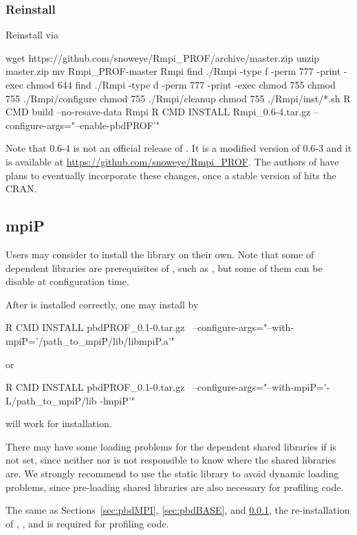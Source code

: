 \subsubsection{Reinstall }
\label{sec:Rmpi}

Reinstall  via
\begin{Command}
wget https://github.com/snoweye/Rmpi_PROF/archive/master.zip
unzip master.zip
mv Rmpi_PROF-master Rmpi
find ./Rmpi -type f -perm 777 -print -exec chmod 644 {} \;
find ./Rmpi -type d -perm 777 -print -exec chmod 755 {} \;
chmod 755 ./Rmpi/configure
chmod 755 ./Rmpi/cleanup
chmod 755 ./Rmpi/inst/*.sh
R CMD build --no-resave-data Rmpi
R CMD INSTALL Rmpi_0.6-4.tar.gz --configure-args="--enable-pbdPROF'"
\end{Command}
Note that {\color{red} 0.6-4} is not an official release of .
It is a modified version of 0.6-3 and it is available at
\url{https://github.com/snoweye/Rmpi_PROF}.  The authors of  have plans 
to eventually incorporate these changes, once a stable version of 
hits the CRAN.


\subsection{mpiP}
\label{sec:mpiP}

Users may consider to install the  library on their own.
Note that some of dependent libraries are prerequisites of ,
such as , but some of them can be disable at 
configuration time.

After  is installed correctly, one may install  by
\begin{Command}
R CMD INSTALL pbdPROF_0.1-0.tar.gz \
  --configure-args="--with-mpiP='/path_to_mpiP/lib/libmpiP.a'"
\end{Command}
or
\begin{Command}
R CMD INSTALL pbdPROF_0.1-0.tar.gz \
  --configure-args="--with-mpiP='-L/path_to_mpiP/lib -lmpiP'"
\end{Command}
will work for  installation.

{\color{red} There may have some loading problems for the dependent shared
libraries if  is not set,} since neither  nor
\pkg{pbdPROF} is not responsible to know where the shared libraries are.
We strongly recommend to use the static library to avoid dynamic loading
problems, since pre-loading shared libraries are also necessary for
profiling code.

The same as Sections~\ref{sec:pbdMPI}, \ref{sec:pbdBASE}, and \ref{sec:Rmpi},
the re-installation of , , and 
is required for profiling code.

% 


